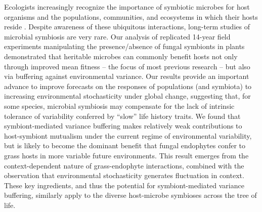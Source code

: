 \documentclass[12pt]{article}
\begin{document}
Ecologists increasingly recognize the importance of symbiotic microbes for host organisms and the populations, communities, and ecosystems in which their hosts reside \cite{rudgers2007forest, afkhami2016native, dallas2022captivity, smith2017symbiont}.
Despite awareness of these ubiquitous interactions, long-term studies of microbial symbiosis are very rare. 
Our analysis of replicated 14-year field experiments manipulating the presence/absence of fungal symbionts in plants demonstrated that heritable microbes can commonly benefit hosts not only through improved mean fitness -- the focus of most previous research -- but also via buffering against environmental variance. 
Our results provide an important advance to improve forecasts on the responses of populations (and symbiota) to increasing environmental stochasticity under global change, suggesting that, for some species, microbial symbiosis may compensate for the lack of intrinsic tolerance of variability conferred by ``slow'' life history traits. 
We found that symbiont-mediated variance buffering makes relatively weak contributions to host-symbiont mutualism under the current regime of environmental variability, but is likely to become the dominant benefit that fungal endophytes confer to grass hosts in more variable future environments.
This result emerges from the context-dependent nature of grass-endophyte interactions, combined with the observation that environmental stochasticity generates fluctuation in context. 
These key ingredients, and thus the potential for symbiont-mediated variance buffering, similarly apply to the diverse host-microbe symbioses across the tree of life. 




\end{document}
